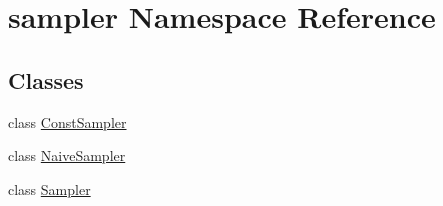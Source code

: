 \hypertarget{namespacesampler}{}\section{sampler Namespace Reference}
\label{namespacesampler}
\subsection*{Classes}
\begin{DoxyCompactItemize}
\item 
class \mbox{\hyperlink{classsampler_1_1ConstSampler}{Const\+Sampler}}
\item 
class \mbox{\hyperlink{classsampler_1_1NaiveSampler}{Naive\+Sampler}}
\item 
class \mbox{\hyperlink{classsampler_1_1Sampler}{Sampler}}
\end{DoxyCompactItemize}
